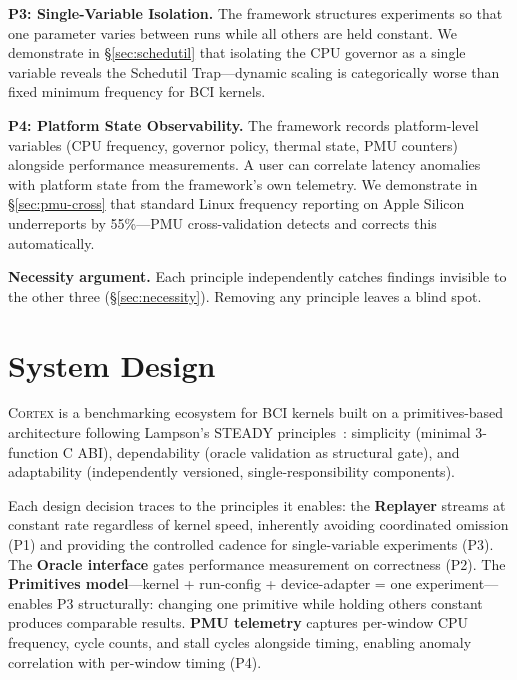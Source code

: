 \documentclass[sigplan,10pt]{acmart}
\newcommand{\cortex}{\textsc{Cortex}}
\begin{document}
\textbf{P3: Single-Variable Isolation.}
The framework structures experiments so that one parameter varies between runs while all others are held constant. We demonstrate in \S\ref{sec:schedutil} that isolating the CPU governor as a single variable reveals the Schedutil Trap---dynamic scaling is categorically worse than fixed minimum frequency for BCI kernels.

\textbf{P4: Platform State Observability.}
The framework records platform-level variables (CPU frequency, governor policy, thermal state, PMU counters) alongside performance measurements. A user can correlate latency anomalies with platform state from the framework's own telemetry. We demonstrate in \S\ref{sec:pmu-cross} that standard Linux frequency reporting on Apple Silicon underreports by 55\%---PMU cross-validation detects and corrects this automatically.

\textbf{Necessity argument.} Each principle independently catches findings invisible to the other three (\S\ref{sec:necessity}). Removing any principle leaves a blind spot.


\section{System Design}
\label{sec:design}

\cortex{} is a benchmarking ecosystem for BCI kernels built on a primitives-based architecture following Lampson's STEADY principles~\cite{lampson1983hints}: simplicity (minimal 3-function C ABI), dependability (oracle validation as structural gate), and adaptability (independently versioned, single-responsibility components).

Each design decision traces to the principles it enables: the \textbf{Replayer} streams at constant rate regardless of kernel speed, inherently avoiding coordinated omission (P1) and providing the controlled cadence for single-variable experiments (P3). The \textbf{Oracle interface} gates performance measurement on correctness (P2). The \textbf{Primitives model}---kernel + run-config + device-adapter = one experiment---enables P3 structurally: changing one primitive while holding others constant produces comparable results. \textbf{PMU telemetry} captures per-window CPU frequency, cycle counts, and stall cycles alongside timing, enabling anomaly correlation with per-window timing (P4).
\end{document}
